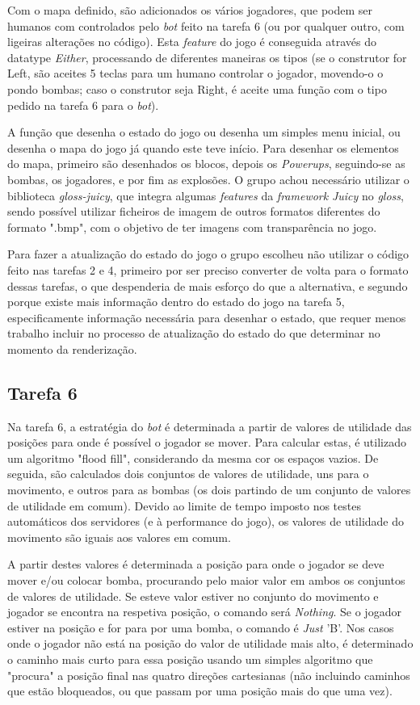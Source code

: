 \documentclass[a4paper]{report}
\begin{document}
Com o mapa definido, são adicionados os vários jogadores, que podem ser humanos com controlados pelo \textit{bot} feito na tarefa 6 (ou por qualquer outro, com ligeiras alterações no código). Esta \textit{feature} do jogo é conseguida através do datatype \textit{Either}, processando de diferentes maneiras os tipos (se o construtor for Left, são aceites 5 teclas para um humano controlar o jogador, movendo-o o pondo bombas; caso o construtor seja Right, é aceite uma função com o tipo pedido na tarefa 6 para o \textit{bot}).

A função que desenha o estado do jogo ou desenha um simples menu inicial, ou desenha o mapa do jogo já quando este teve início. Para desenhar os elementos do mapa, primeiro são desenhados os blocos, depois os \textit{Powerups}, seguindo-se as bombas, os jogadores, e por fim as explosões. O grupo achou necessário utilizar o biblioteca \textit{gloss-juicy}, que integra algumas \textit{features} da \textit{framework} \textit{Juicy} no \textit{gloss}, sendo possível utilizar ficheiros de imagem de outros formatos diferentes do formato ".bmp", com o objetivo de ter imagens com transparência no jogo.

Para fazer a atualização do estado do jogo o grupo escolheu não utilizar o código feito nas tarefas 2 e 4, primeiro por ser preciso converter de volta para o formato dessas tarefas, o que despenderia de mais esforço do que a alternativa, e segundo porque existe mais informação dentro do estado do jogo na tarefa 5, especificamente informação necessária para desenhar o estado, que requer menos trabalho incluir no processo de atualização do estado do que determinar no momento da renderização.

\subsection{Tarefa 6}
Na tarefa 6, a estratégia do \textit{bot} é determinada a partir de valores de utilidade das posições para onde é possível o jogador se mover. Para calcular estas, é utilizado um algoritmo "flood fill", considerando da mesma cor os espaços vazios. De seguida, são calculados dois conjuntos de valores de utilidade, uns para o movimento, e outros para as bombas (os dois partindo de um conjunto de valores de utilidade em comum). Devido ao limite de tempo imposto nos testes automáticos dos servidores (e à performance do jogo), os valores de utilidade do movimento são iguais aos valores em comum.

A partir destes valores é determinada a posição para onde o jogador se deve mover e/ou colocar bomba, procurando pelo maior valor em ambos os conjuntos de valores de utilidade. Se esteve valor estiver no conjunto do movimento e jogador se encontra na respetiva posição, o comando será \textit{Nothing}. Se o jogador estiver na posição e for para por uma bomba, o comando é \textit{Just} 'B'. Nos casos onde o jogador não está na posição do valor de utilidade mais alto, é determinado o caminho mais curto para essa posição usando um simples algoritmo que "procura" a posição final nas quatro direções cartesianas (não incluindo caminhos que estão bloqueados, ou que passam por uma posição mais do que uma vez).
\end{document}
